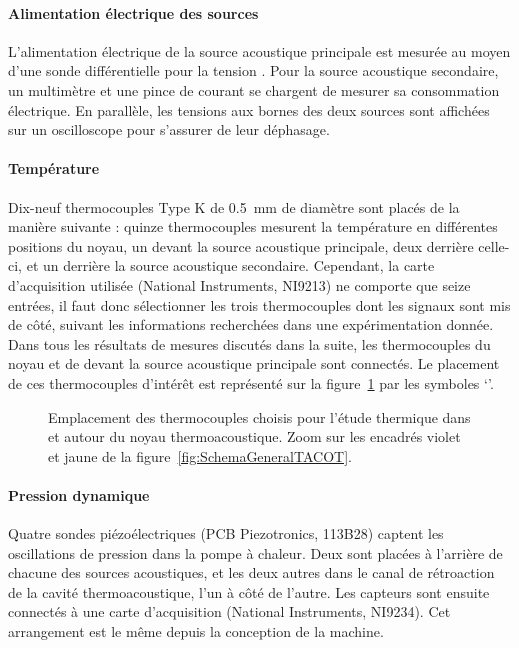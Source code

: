 \paragraph{Alimentation électrique des sources} L'alimentation électrique de la source acoustique principale est mesurée au moyen d'une sonde différentielle pour la tension . Pour la source acoustique secondaire, un multimètre  et une pince de courant  se chargent de mesurer sa consommation électrique. En parallèle, les tensions aux bornes des deux sources sont affichées sur un oscilloscope pour s'assurer de leur déphasage.

\paragraph{Température} Dix-neuf thermocouples Type K de \qty{.5}{\milli\meter} de diamètre sont placés de la manière suivante : quinze thermocouples mesurent la température en différentes positions du noyau, un devant la source acoustique principale, deux derrière celle-ci, et un derrière la source acoustique secondaire. Cependant, la carte d'acquisition utilisée (National Instruments, NI9213) ne comporte que seize entrées, il faut donc sélectionner les trois thermocouples dont les signaux sont mis de côté, suivant les informations recherchées dans une expérimentation donnée. Dans tous les résultats de mesures discutés dans la suite, les thermocouples du noyau et de devant la source acoustique principale sont connectés. Le placement de ces thermocouples d'intérêt est représenté sur la figure~\ref{fig:TCdansNoyau} par les symboles `\textcolor{cyan}{\textbullet}'.

\begin{figure}[!ht]
    \centering
    
    \caption{Emplacement des thermocouples choisis pour l'étude thermique dans et autour du noyau thermoacoustique. Zoom sur les encadrés violet et jaune de la figure~\ref{fig:SchemaGeneralTACOT}. }
    \label{fig:TCdansNoyau}
\end{figure}

\paragraph{Pression dynamique} Quatre sondes piézoélectriques (PCB Piezotronics, 113B28) captent les oscillations de pression dans la pompe à chaleur. Deux sont placées à l'arrière de chacune des sources acoustiques, et les deux autres dans le canal de rétroaction de la cavité thermoacoustique, l'un à côté de l'autre. Les capteurs sont ensuite connectés à une carte d'acquisition (National Instruments, NI9234). Cet arrangement est le même depuis la conception de la machine.

